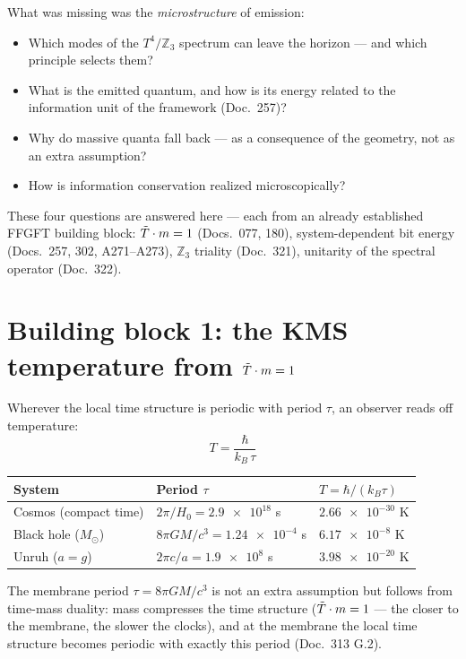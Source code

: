 What was missing was the \emph{microstructure} of emission:
\begin{itemize}
  \item Which modes of the $T^4/\mathbb{Z}_3$ spectrum can leave the
    horizon — and which principle selects them?
  \item What is the emitted quantum, and how is its energy related to
    the information unit of the framework (Doc.\ 257)?
  \item Why do massive quanta fall back — as a consequence of the
    geometry, not as an extra assumption?
  \item How is information conservation realized microscopically?
\end{itemize}
These four questions are answered here — each from an already
established FFGFT building block: $\tilde{T}\cdot m = 1$ (Docs.\ 077, 180),
system-dependent bit energy (Docs.\ 257, 302, A271--A273),
$\mathbb{Z}_3$ triality (Doc.\ 321), unitarity of the spectral operator
(Doc.\ 322).

\section{Building block 1: the KMS temperature from \texorpdfstring{$\tilde{T}\cdot m = 1$}{T*m=1}}

Wherever the local time structure is periodic with period $\tau$,
an observer reads off temperature:
\begin{equation}
  T = \frac{\hbar}{k_B\,\tau}
  \label{eq:kms}
\end{equation}

\begin{center}
\small
\begin{tabular}{@{}lll@{}}
  \toprule
  System & Period $\tau$ & $T = \hbar/(k_B\tau)$ \\
  \midrule
  Cosmos (compact time) & $2\pi/H_0 = \num{2.9e18}$ s & $\num{2.66e-30}$ K \\
  Black hole ($M_\odot$) & $8\pi GM/c^3 = \num{1.24e-4}$ s & $\num{6.17e-8}$ K \\
  Unruh ($a = g$) & $2\pi c/a = \num{1.9e8}$ s & $\num{3.98e-20}$ K \\
  \bottomrule
\end{tabular}
\end{center}

The membrane period $\tau = 8\pi GM/c^3$ is not an extra assumption
but follows from time-mass duality: mass compresses the time structure
($\tilde{T}\cdot m = 1$ — the closer to the membrane, the slower the
clocks), and at the membrane the local time structure becomes periodic
with exactly this period (Doc.\ 313 G.2). \K

